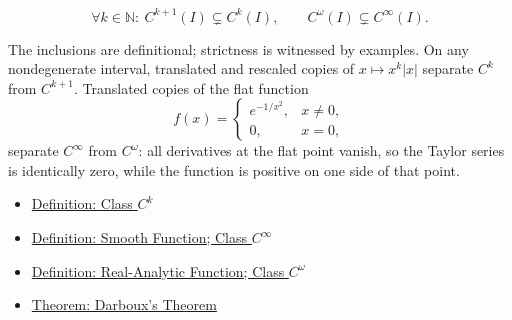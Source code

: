 \begin{remark*}
\[
  \forall k\in\mathbb{N}:\ C^{k+1}(I)\subsetneq C^k(I),
  \qquad
  C^\omega(I)\subsetneq C^\infty(I).
\]
\end{remark*}

\begin{remark*}[Interpretation]
The inclusions are definitional; strictness is witnessed by examples. On any nondegenerate interval, translated and rescaled copies of \(x\mapsto x^k|x|\) separate \(C^k\) from \(C^{k+1}\). Translated copies of the flat function
\[
  f(x)=
  \begin{cases}
    e^{-1/x^2}, & x\neq 0,\\
    0, & x=0,
  \end{cases}
\]
separate \(C^\infty\) from \(C^\omega\): all derivatives at the flat point vanish, so the Taylor series is identically zero, while the function is positive on one side of that point.
\end{remark*}

\begin{dependencies}
\begin{itemize}
  \item \hyperref[def:class-ck]{Definition: Class \(C^k\)}
  \item \hyperref[def:class-cinfty]{Definition: Smooth Function; Class \(C^\infty\)}
  \item \hyperref[def:class-comega]{Definition: Real-Analytic Function; Class \(C^\omega\)}
  \item \hyperref[thm:darboux]{Theorem: Darboux's Theorem}
\end{itemize}
\end{dependencies}
